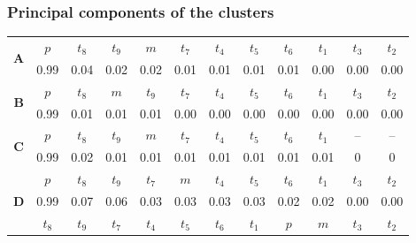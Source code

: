 \documentclass[svgnames, table, smaller]{beamer}
\begin{document}
\begin{frame}
  \frametitle{Principal components of the clusters}

{\tiny
\begin{table}[!ht]
  \centering
  \begin{tabular}{|c|c|c|c|c|c|c|c|c|c|c|c|}
    \hline
    \multirow{2}{*}{\textbf{A}}   & $p$ & \cellcolor[gray]{0.45} $t_8$ & \cellcolor[gray]{0.50} $t_9$  & $m$ & \cellcolor[gray]{0.65} $t_7$ & \cellcolor[gray]{0.60} $t_4$ & \cellcolor[gray]{0.70} $t_5$ & \cellcolor[gray]{0.75} $t_6$ & \cellcolor[gray]{0.40} $t_1$ & \cellcolor[gray]{0.80} $t_3$ & \cellcolor[gray]{0.55} $t_2$ \\
    & 0.99  & 0.04  & 0.02 & 0.02 & 0.01 & 0.01 & 0.01 & 0.01 & 0.00 & 0.00 & 0.00 \\
    \hline
    \multirow{2}{*}{\textbf{B}}   & $p$ & \cellcolor[gray]{0.45} $t_8$ &  $m$  & \cellcolor[gray]{0.50}$t_9$ & \cellcolor[gray]{0.65} $t_7$ & \cellcolor[gray]{0.60} $t_4$ & \cellcolor[gray]{0.70} $t_5$ & \cellcolor[gray]{0.75} $t_6$ & \cellcolor[gray]{0.40} $t_1$ & \cellcolor[gray]{0.80} $t_3$ & \cellcolor[gray]{0.55} $t_2$ \\
    & 0.99 & 0.01 & 0.01 & 0.01 &  0.00 & 0.00 & 0.00 & 0.00 & 0.00 & 0.00 & 0.00 \\
    \hline
    \multirow{2}{*}{\textbf{C}} & $p$ & \cellcolor[gray]{0.45} $t_8$ & \cellcolor[gray]{0.50} $t_9$ &  $m$ & \cellcolor[gray]{0.65} $t_7$ & \cellcolor[gray]{0.60} $t_4$ & \cellcolor[gray]{0.70} $t_5$ & \cellcolor[gray]{0.75} $t_6$ & \cellcolor[gray]{0.40} $t_1 $ & -- & -- \\
    & 0.99 & 0.02 & 0.01 & 0.01 & 0.01 & 0.01 & 0.01 & 0.01 & 0.01 & 0 & 0 \\
    \hline
    \multirow{4}{*}{\textbf{D}} & $p$ & \cellcolor[gray]{0.45} $t_8$ & \cellcolor[gray]{0.50} $t_9$ &  \cellcolor[gray]{0.65} $t_7$ & $m$ & \cellcolor[gray]{0.60} $t_4$ & \cellcolor[gray]{0.70} $t_5$ & \cellcolor[gray]{0.75} $t_6$ &\cellcolor[gray]{0.40} $t_1$ &\cellcolor[gray]{0.80} $t_3$ & \cellcolor[gray]{0.55} $t_2$ \\
    & 0.99 & 0.07 & 0.06 & 0.03 & 0.03 & 0.03 & 0.03 & 0.02 & 0.02 & 0.00 & 0.00 \\ 
    \cline{2-12}
    & \cellcolor[gray]{0.45} $t_8$ & \cellcolor[gray]{0.50} $t_9$ & \cellcolor[gray]{0.65} $t_7$ &  \cellcolor[gray]{0.60} $t_4$ & \cellcolor[gray]{0.70} $t_5$ & \cellcolor[gray]{0.75} $t_6$ & \cellcolor[gray]{0.40} $t_1$ & $p$ & $m$ & \cellcolor[gray]{0.80} $t_3$ & \cellcolor[gray]{0.55} $t_2$ \\

\end{tabular}
\end{table}}
\end{frame}
\end{document}

